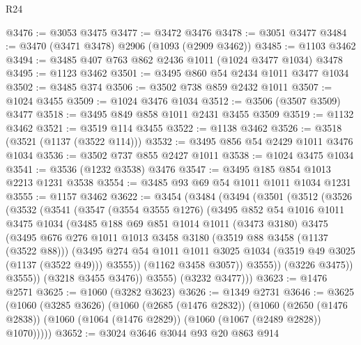 \begin{lexlean}{R24}
\begin{coremodule}
@3476 := @3053 @3475
@3477 := @3472 @3476
@3478 := @3051 @3477
@3484 := @3470 (@3471 @3478) @2906 (@1093 (@2909 @3462))
@3485 := @1103 @3462
@3494 := @3485 @407 @763 @862 @2436 @1011 (@1024 @3477 @1034) @3478
@3495 := @1123 @3462
@3501 := @3495 @860 @54 @2434 @1011 @3477 @1034
@3502 := @3485 @374
@3506 := @3502 @738 @859 @2432 @1011
@3507 := @1024 @3455
@3509 := @1024 @3476 @1034
@3512 := @3506 (@3507 @3509) @3477
@3518 := @3495 @849 @858 @1011 @2431 @3455 @3509
@3519 := @1132 @3462
@3521 := @3519 @114 @3455
@3522 := @1138 @3462
@3526 := @3518 (@3521 (@1137 (@3522 @114)))
@3532 := @3495 @856 @54 @2429 @1011 @3476 @1034
@3536 := @3502 @737 @855 @2427 @1011
@3538 := @1024 @3475 @1034
@3541 := @3536 (@1232 @3538) @3476
@3547 := @3495 @185 @854 @1013 @2213 @1231 @3538
@3554 := @3485 @93 @69 @54 @1011 @1011 @1034 @1231
@3555 := @1157 @3462
@3622 := @3454
    (@3484
      (@3494
        (@3501
          (@3512
            (@3526
              (@3532
                (@3541
                  (@3547
                    (@3554 @3555 @1276)
                    (@3495
                      @852
                      @54
                      @1016
                      @1011
                      @3475
                      @1034
                      (@3485
                        @188
                        @69
                        @851
                        @1014
                        @1011
                        (@3473 @3180)
                        @3475
                        (@3495
                          @676
                          @276
                          @1011
                          @1013
                          @3458
                          @3180
                          (@3519 @88 @3458 (@1137 (@3522 @88)))
                          (@3495
                            @274
                            @54
                            @1011
                            @1011
                            @3025
                            @1034
                            (@3519 @49 @3025 (@1137 (@3522 @49)))
                            @3555))
                        (@1162 @3458 @3057))
                      @3555))
                  (@3226 @3475))
                @3555))
            (@3218 @3455 @3476))
          @3555)
        (@3232 @3477)))
@3623 := @1476 @2571
@3625 := @1060 (@3282 @3623)
@3626 := @1349 @2731
@3646 := @3625
    (@1060
      (@3285 @3626)
      (@1060
        (@2685 (@1476 @2832))
        (@1060
          (@2650 (@1476 @2838))
          (@1060 (@1064 (@1476 @2829)) (@1060 (@1067 (@2489 @2828)) @1070)))))
@3652 := @3024 @3646 @3044 @93 @20 @863 @914

\end{coremodule}
\end{lexlean}
